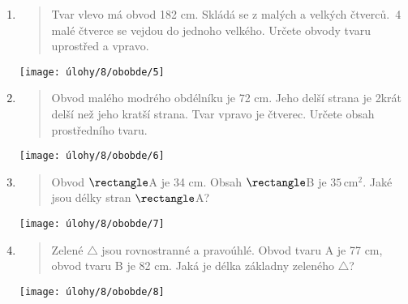 \begin{enumerate}
\begin{minipage}[t]{\linewidth}
    \end{minipage}

    \item
    \begin{minipage}[t]{\linewidth}
        \begin{quote}
            Tvar vlevo má obvod 182 cm.
            Skládá se z malých a velkých čtverců.\ 4 malé čtverce se vejdou do jednoho velkého.
            Určete obvody tvaru uprostřed a vpravo.
        \end{quote}
        \centering
        \texttt{[image: úlohy/8/obobde/5]}

    \end{minipage}

    \item
    \begin{minipage}[t]{\linewidth}
        \begin{quote}
            Obvod malého modrého obdélníku je 72 cm.
            Jeho delší strana je 2krát delší než jeho kratší strana.
            Tvar vpravo je čtverec.
            Určete obsah prostředního tvaru.
        \end{quote}
        \centering
        \texttt{[image: úlohy/8/obobde/6]}

    \end{minipage}

    \item
    \begin{minipage}[t]{\linewidth}
        \begin{quote}
            Obvod $\rectangle$A je 34 cm.
            Obsah $\rectangle$B je $35\,\text{cm}^{2}$.
            Jaké jsou délky stran $\rectangle$A?
        \end{quote}
        \centering
        \texttt{[image: úlohy/8/obobde/7]}

    \end{minipage}

    \item
    \begin{minipage}[t]{\linewidth}
        \begin{quote}
            Zelené $\triangle$ jsou rovnostranné a pravoúhlé.
            Obvod tvaru A je 77 cm, obvod tvaru B je 82 cm.
            Jaká je délka základny zeleného $\triangle$?
        \end{quote}
        \centering
        \texttt{[image: úlohy/8/obobde/8]}


\end{minipage}
\end{enumerate}
